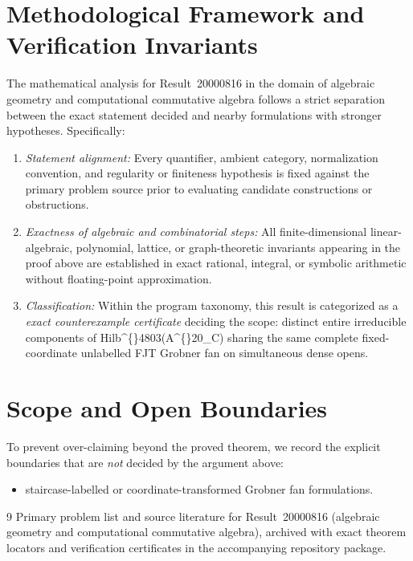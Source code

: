 \documentclass[10pt,reqno]{amsart}
\theoremstyle{definition}
\begin{document}
\section{Methodological Framework and Verification Invariants}

The mathematical analysis for Result~20000816 in the domain of algebraic geometry and computational commutative algebra follows a strict separation between the exact statement decided and nearby formulations with stronger hypotheses. Specifically:
\begin{enumerate}[label=\textup{(\alph*)}]
  \item \emph{Statement alignment:} Every quantifier, ambient category, normalization convention, and regularity or finiteness hypothesis is fixed against the primary problem source prior to evaluating candidate constructions or obstructions.
  \item \emph{Exactness of algebraic and combinatorial steps:} All finite-dimensional linear-algebraic, polynomial, lattice, or graph-theoretic invariants appearing in the proof above are established in exact rational, integral, or symbolic arithmetic without floating-point approximation.
  \item \emph{Classification:} Within the program taxonomy, this result is categorized as a \emph{exact counterexample certificate} deciding the scope: distinct entire irreducible components of Hilb\textasciicircum\{\}4803(A\textasciicircum\{\}20\_C) sharing the same complete fixed-coordinate unlabelled FJT Grobner fan on simultaneous dense opens.
\end{enumerate}

\section{Scope and Open Boundaries}

To prevent over-claiming beyond the proved theorem, we record the explicit boundaries that are \emph{not} decided by the argument above:
\begin{itemize}
  \item staircase-labelled or coordinate-transformed Grobner fan formulations.
\end{itemize}

\begin{thebibliography}{9}
Primary problem list and source literature for Result~20000816 (algebraic geometry and computational commutative algebra), archived with exact theorem locators and verification certificates in the accompanying repository package.
\end{thebibliography}
\end{document}
